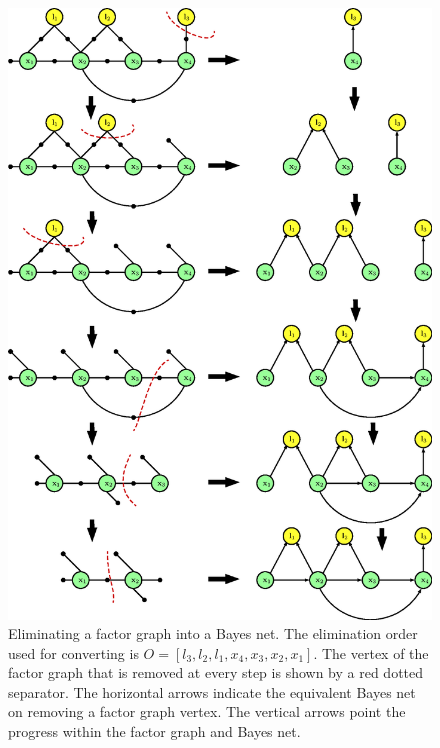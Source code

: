 \begin{figure}
\centering
\includegraphics[width=\textwidth]{Chapters/figures2/from_fg_to_bn}
\caption{Eliminating a factor graph into a Bayes net. The elimination order used for converting is $O = [l_3, l_2, l_1, x_4, x_3, x_2, x_1]$. The vertex of the factor graph that is removed at every step is shown by a red dotted separator. The horizontal arrows indicate the equivalent Bayes net on removing a factor graph vertex. The vertical arrows point the progress within the factor graph and Bayes net.}
\label{fig:fg_to_bn}
\end{figure}
